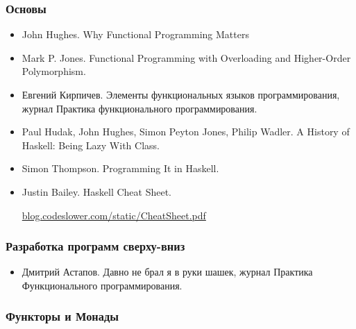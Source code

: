 \subsubsection{Основы}

\begin{itemize}
\item John Hughes. Why Functional Programming Matters

\item Mark P. Jones. Functional Programming with Overloading
    and Higher-Order Polymorphism.

\item Евгений Кирпичев. Элементы функциональных 
    языков программирования, журнал Практика функционального
    программирования.

\item Paul Hudak, John Hughes, Simon Peyton Jones, Philip Wadler.
    A History of Haskell: Being Lazy With Class.

\item Simon Thompson. Programming It in Haskell.

\item Justin Bailey. Haskell Cheat Sheet.

    \url{blog.codeslower.com/static/CheatSheet.pdf}

\end{itemize}


\subsubsection{Разработка программ сверху-вниз}

\begin{itemize}
\item Дмитрий Астапов. Давно не брал я в руки шашек,
    журнал Практика Функционального программирования.
\end{itemize}


\subsubsection{Функторы и Монады}

